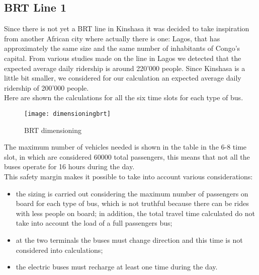 \documentclass{article}
\begin{document}
\subsection{BRT Line 1}
Since there is not yet a BRT line in Kinshasa it was decided to take inspiration from another African city where actually there is one: Lagos, that has approximately the same size and the same number of inhabitants of Congo’s capital. 
From various studies made on the line in Lagos we detected that the expected average daily ridership is around 220’000 people. Since Kinshasa is a little bit smaller, we considered for our calculation an expected average daily ridership of 200’000 people.\\
Here are shown the calculations for all the six time slots for each type of bus. 
\begin{figure}[H]
{\centering
\texttt{[image: dimensioningbrt]}
\caption{BRT dimensioning}}
\end{figure} 
The maximum number of vehicles needed is shown in the table in the 6-8 time slot, in which are considered 60000 total passengers, this means that not all the buses operate for 16 hours during the day.\\
This safety margin makes it possible to take into account various considerations: 
\begin{itemize}
\item the sizing is carried out considering the maximum number of passengers on board for each type of bus, which is not truthful because there can be rides with less people on board; in addition, the total travel time calculated do not take into account the load of a full passengers bus;  
\item at the two terminals the buses must change direction and this time is not considered into calculations; 
\item the electric buses must recharge at least one time during the day.
\end{itemize}
\newpage
\end{document}
